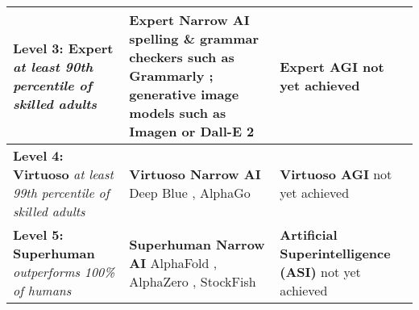 \documentclass{article}
\theoremstyle{plain}
\theoremstyle{definition}
\theoremstyle{remark}
\begin{document}
\begin{table*}[t]
\begin{center}
\begin{small}
\begin{tabular}{|p{}|p{}|p{}|}
    \textbf{Level 3: Expert} \newline \textit{at least 90th percentile of skilled adults} & \textbf{Expert Narrow AI} \newline spelling \& grammar checkers such as Grammarly \citep{grammarly}; generative image models such as Imagen \citep{saharia2022photorealistic} or Dall-E 2 \citep{dalle2} & \textbf{Expert AGI} \newline not yet achieved  \\ \hline
    \textbf{Level 4: Virtuoso} \newline \textit{at least 99th percentile of skilled adults} & \textbf{Virtuoso Narrow AI} \newline Deep Blue \citep{deepblue}, AlphaGo \citep{alphago, alphagoRL} & \textbf{Virtuoso AGI} \newline not yet achieved  \\ \hline
    \textbf{Level 5: Superhuman} \newline \textit{outperforms 100\% of humans} & \textbf{Superhuman Narrow AI} \newline AlphaFold \citep{alphafold1,alphafold2}, AlphaZero \citep{alphazero}, StockFish \citep{stockfish} 
    & \textbf{Artificial Superintelligence (ASI)} \newline not yet achieved \\ \hline
    \end{tabular}
\end{small}
\end{center}
\end{table*}
\end{document}
